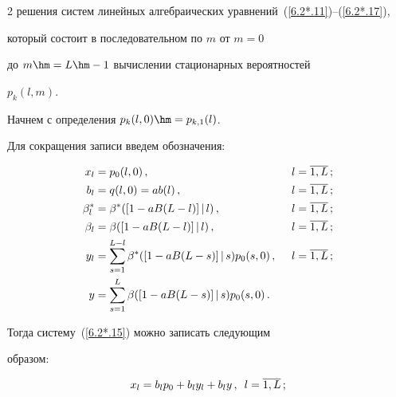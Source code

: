 \begin{multicols}{2}
решения сис\-тем линейных алгебраических урав\-не\-ний~(\ref{6.2*.11})--(\ref{6.2*.17}),


который со\-сто\-ит в последовательном по $m$ от $m=0$


до $m\hm=L\hm-1$ вычислении стационарных вероятностей


$p_{k}(l,m)$.





Начнем с определения $p_{k}(l,0)\hm=p_{k,1}(l)$.





Для сокращения записи введем обозначения:


\begin{alignat*}{2}


x_l &= p_{0}(l,0)\,, &\enskip l&=\overline{1,L}\,;


\\


b_l &= q(l,0) = a b(l)\,, &\enskip l&=\overline{1,L}\,;


\\


\beta^*_l &= \beta^*([1 - a B(L-l)]\,|\,l)\,, &\enskip l&=\overline{1,L}\,;


\\


\beta_l &= \beta([1 - a B(L-l)]\,|\,l)\,, &\enskip  l&=\overline{1,L}\,;


\\


y_l &= \sum\limits_{s=1}^{L-l} \beta^*([1 - a B(L-s)]\,|\,s) p_{0}(s,0)\,, &\enskip l&=\overline{1,L}\,;


\\


y &= \sum\limits_{s=1}^{L} \beta([1 - a B(L-s)]\,|\,s) p_{0}(s,0) \,.&&


\end{alignat*}


Тогда систему~(\ref{6.2*.15}) можно записать следующим


образом:




\begin{gather}


\label{6.3*.1}


x_{l}= b_l p_0 + b_l y_l + b_l y \,,\enskip l=\overline{1,L}\,;


\\


\label{6.3*.2}



\end{gather}
\end{multicols}

